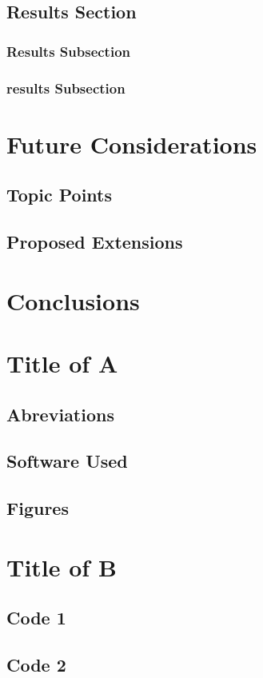 \documentclass[a4paper,twoside,12pt]{book}
\begin{document}
			\section{Results Section}
				\subsection{Results Subsection}
				\subsection{results Subsection}	
		\chapter{Future Considerations} 
			\section{Topic Points} 
			\section{Proposed Extensions} 
		\chapter{Conclusions} 
	
	\appendix
		\chapter{Title of A}
			\section{Abreviations} %
			\section{Software Used} %
			\section{Figures} %
		\chapter{Title of B}
			\section {Code 1}
			\section {Code 2}

	\backmatter
		
		

	
\end{document}
